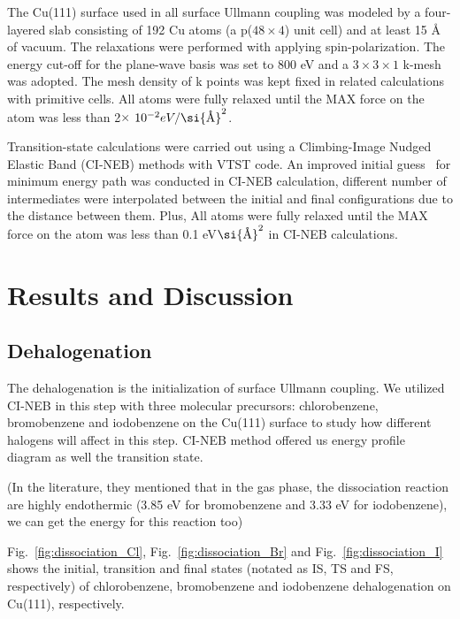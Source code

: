 \documentclass[%
 reprint,
 amsmath,amssymb,
 aps,
prb,
]{revtex4-2}
\newcommand{\angstrom}{\textup{\AA}}
\begin{document}
The Cu(111) surface used in all surface Ullmann coupling was 
modeled by a four-layered slab consisting of 192 Cu atoms (a p($48\times 4$) unit cell) and at least 15 \si{\angstrom} of vacuum. The relaxations were performed with applying spin-polarization. The energy cut-off for the plane-wave basis was set to 800 eV and a $3\times 3 \times1$ k-mesh was adopted. The mesh density of k points was kept fixed in related calculations with primitive cells. All atoms were fully relaxed until the MAX force on the atom was less than 2$\times$ $10^{-2} eV/\si{\angstrom}^{2}$. 

Transition-state calculations were carried out using a Climbing-Image Nudged Elastic Band (CI-NEB) methods with VTST code\cite{ullmann_59}. An improved initial guess~\cite{ullmann_60} for minimum energy path was conducted in CI-NEB calculation, different number of intermediates were interpolated between the initial and final configurations due to the distance between them. Plus, All atoms were fully relaxed until the MAX force on the atom was less than 0.1 eV$\si{\angstrom}^{2}$ in CI-NEB calculations.

\section{Results and Discussion}

\subsection{Dehalogenation}

The dehalogenation is the initialization of surface Ullmann coupling. 
We utilized CI-NEB in this step with three molecular precursors: chlorobenzene, bromobenzene and iodobenzene on the Cu(111) surface to study how different halogens will affect in this step. CI-NEB method offered us energy profile diagram as well the transition state.

(In the literature, they mentioned that in the gas phase, the dissociation reaction are highly endothermic (3.85 eV for bromobenzene and 3.33 eV for iodobenzene), we can get the energy for this reaction too)

Fig.~\ref{fig:dissociation_Cl}, Fig.~\ref{fig:dissociation_Br} and Fig.~\ref{fig:dissociation_I} shows the initial, transition and final states (notated as IS, TS and FS, respectively) of chlorobenzene, bromobenzene and iodobenzene dehalogenation on Cu(111), respectively. 
\end{document}
